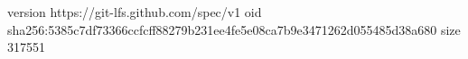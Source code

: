version https://git-lfs.github.com/spec/v1
oid sha256:5385c7df73366ccfcff88279b231ee4fe5e08ca7b9e3471262d055485d38a680
size 317551
